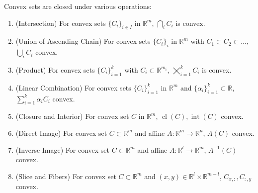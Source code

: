 \begin{prop}\label{prop:011-conv-yoga}
	Convex sets are closed under various operations:
	\begin{enumerate}[label=(\alph*)]
		\item (Intersection) For convex sets $\{C_i\}_{i\in I}$ in $\mathbb{R}^m$, $\bigcap_iC_i$ is convex.
		\item (Union of Ascending Chain) For convex sets $\{C_i\}_{i}$ in $\mathbb{R}^m$ with $C_1\subset C_2\subset\dotsc$, $\bigcup_iC_i$ convex.
		\item (Product) For convex sets $\{C_i\}_{i=1}^k$ with $C_i\subset \mathbb{R}^{m_i}$, $\bigtimes_{i=1}^kC_i$ is convex.
		\item (Linear Combination) For convex sets $\{C_i\}_{i=1}^k$ in $\mathbb{R}^m$ and $\{\alpha_i\}_{i=1}^k\subset \mathbb{R}$, $\sum_{i=1}^k\alpha_iC_i$ convex.
		\item (Closure and Interior) For convex set $C$ in $\mathbb{R}^m$, $\operatorname{cl}(C),\operatorname{int}(C)$ convex.
		\item (Direct Image) For convex set $C\subset \mathbb{R}^m$ and affine $A:\mathbb{R}^m\to \mathbb{R}^n$, $A(C)$ convex.
		\item (Inverse Image) For convex set $C\subset \mathbb{R}^m$ and affine $A:\mathbb{R}^l\to \mathbb{R}^m$, $A^{-1}(C)$ convex.
		\item (Slice and Fibers) For convex set $C\subset \mathbb{R}^m$ and $(x,y)\in \mathbb{R}^l\times \mathbb{R}^{m-l}$, $C_{x,:},C_{:,y}$ convex.
	\end{enumerate}
\end{prop}
